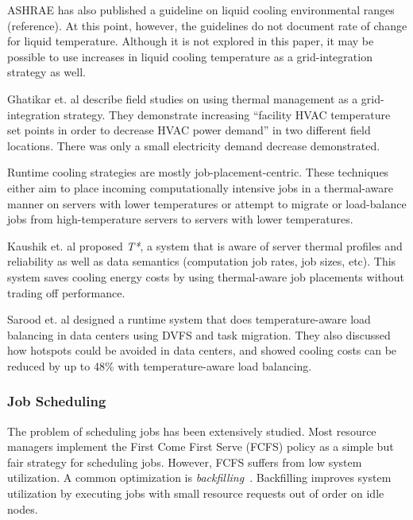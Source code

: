 ASHRAE has also published a guideline on liquid cooling environmental ranges
(reference). At this point, however, the guidelines do not document rate of
change for liquid temperature. Although it is not explored in this paper, it
may be possible to use increases in liquid cooling temperature as a
grid-integration strategy as well. 

Ghatikar et. al \cite{Ghatikar2012a} describe field studies on using thermal
management as a grid-integration strategy. They demonstrate increasing ``facility HVAC temperature set points in order to decrease HVAC power
demand” in two different field locations. There was only a small
electricity demand decrease demonstrated.

Runtime cooling strategies are mostly job-placement-centric. These techniques
either aim to place incoming computationally intensive jobs in a thermal-aware
manner on servers with lower temperatures or attempt to migrate or load-balance
jobs from high-temperature servers to servers with lower temperatures.

Kaushik et. al \cite{kaushik_t*:_2012} proposed \emph{T*}, a system that is
aware of server thermal profiles and reliability as well as data semantics
(computation job rates, job sizes, etc). This system saves cooling energy costs
by using thermal-aware job placements without trading off performance.

Sarood et. al \cite{SaroodSC11} designed a runtime system that does
temperature-aware load balancing in data centers using DVFS and task migration.
They also discussed how hotspots could be avoided in data centers, and showed
cooling costs can be reduced by up to 48\% with temperature-aware load
balancing.

\subsubsection{Job Scheduling}
The problem of scheduling jobs has been extensively studied. Most resource
managers implement the First Come First Serve (FCFS) policy as a simple but fair
strategy for scheduling jobs. However, FCFS suffers from low system utilization.
A common optimization is \emph{backfilling}~\cite{lifka_anl/ibm_1995,mualem_utilization_2001,feitelson_parallel_2004}.
Backfilling improves system utilization by executing jobs with small resource
requests out of order on idle nodes.

